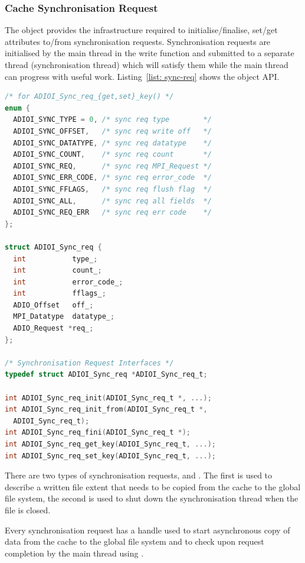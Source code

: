 \subsubsection{Cache Synchronisation Request}
\label{subsubsec: cache-sync-req}
The  object provides the infrastructure required to initialise/finalise, set/get attributes to/from synchronisation requests. Synchronisation requests are initialised by the main thread in the write function and submitted 
to a separate thread (synchronisation thread) which will satisfy them while the main thread can progress with useful work. Listing~\ref{list: sync-req} shows the object API.

\begin{lstlisting}[language=C, caption=Synchronisation Request API, label={list: sync-req}]
/* for ADIOI_Sync_req_{get,set}_key() */
enum {
  ADIOI_SYNC_TYPE = 0, /* sync req type        */
  ADIOI_SYNC_OFFSET,   /* sync req write off   */
  ADIOI_SYNC_DATATYPE, /* sync req datatype    */
  ADIOI_SYNC_COUNT,    /* sync req count       */
  ADIOI_SYNC_REQ,      /* sync req MPI_Request */
  ADIOI_SYNC_ERR_CODE, /* sync req error_code  */
  ADIOI_SYNC_FFLAGS,   /* sync req flush flag  */
  ADIOI_SYNC_ALL,      /* sync req all fields  */
  ADIOI_SYNC_REQ_ERR   /* sync req err code    */
};

struct ADIOI_Sync_req {
  int           type_;
  int           count_;
  int           error_code_;
  int           fflags_;
  ADIO_Offset   off_;
  MPI_Datatype  datatype_;
  ADIO_Request *req_;
};

/* Synchronisation Request Interfaces */
typedef struct ADIOI_Sync_req *ADIOI_Sync_req_t;

int ADIOI_Sync_req_init(ADIOI_Sync_req_t *, ...);
int ADIOI_Sync_req_init_from(ADIOI_Sync_req_t *, 
  ADIOI_Sync_req_t);
int ADIOI_Sync_req_fini(ADIOI_Sync_req_t *);
int ADIOI_Sync_req_get_key(ADIOI_Sync_req_t, ...);
int ADIOI_Sync_req_set_key(ADIOI_Sync_req_t, ...);
\end{lstlisting}

There are two types of synchronisation requests,  and . The first is used to describe a written file extent that needs to be copied from the cache to the global file system, 
the second is used to shut down the synchronisation thread when the file is closed.

Every synchronisation request has a  handle used to start asynchronous copy of data from the cache to the global file system and to check upon request completion by the main thread using .

